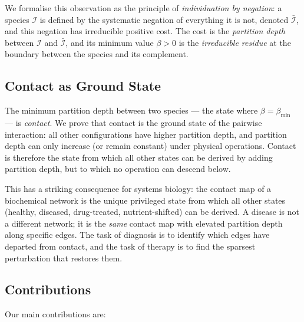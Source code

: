 \documentclass[11pt,twocolumn]{article}
\theoremstyle{plain}
\theoremstyle{definition}
\newcommand{\betamin}{\beta_{\min}}
\begin{document}
We formalise this observation as the principle of \emph{individuation by negation}:
a species $\mathcal{I}$ is defined by the systematic negation of everything it is
not, denoted $\bar{\mathcal{I}}$, and this negation has irreducible positive cost.
The cost is the \emph{partition depth} between $\mathcal{I}$ and $\bar{\mathcal{I}}$,
and its minimum value $\beta > 0$ is the \emph{irreducible residue} at the boundary
between the species and its complement.

\subsection{Contact as Ground State}

The minimum partition depth between two species --- the state where $\beta =
\betamin$ --- is \emph{contact}. We prove that contact is the ground state of
the pairwise interaction: all other configurations have higher partition depth,
and partition depth can only increase (or remain constant) under physical
operations. Contact is therefore the state from which all other states can be
derived by adding partition depth, but to which no operation can descend below.

This has a striking consequence for systems biology: the contact map of a
biochemical network is the unique privileged state from which all other states
(healthy, diseased, drug-treated, nutrient-shifted) can be derived. A disease is
not a different network; it is the \emph{same} contact map with elevated
partition depth along specific edges. The task of diagnosis is to identify which
edges have departed from contact, and the task of therapy is to find the
sparsest perturbation that restores them.

\subsection{Contributions}

Our main contributions are:
\end{document}
